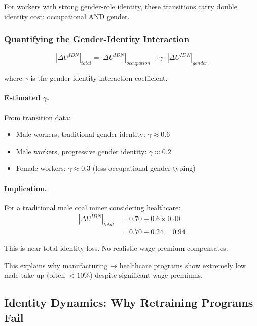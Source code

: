 For workers with strong gender-role identity, these transitions carry 
double identity cost: occupational AND gender.

\subsubsection{Quantifying the Gender-Identity Interaction}

\begin{equation}
|\Delta U^{IDN}|_{total} = |\Delta U^{IDN}|_{occupation} + \gamma \cdot |\Delta U^{IDN}|_{gender}
\label{eq:gender-identity}
\end{equation}

where $\gamma$ is the gender-identity interaction coefficient.

\paragraph{Estimated $\gamma$.}
From transition data:
\begin{itemize}
    \item Male workers, traditional gender identity: $\gamma \approx 0.6$
    \item Male workers, progressive gender identity: $\gamma \approx 0.2$
    \item Female workers: $\gamma \approx 0.3$ (less occupational gender-typing)
\end{itemize}

\paragraph{Implication.}
For a traditional male coal miner considering healthcare:
\begin{align}
|\Delta U^{IDN}|_{total} &= 0.70 + 0.6 \times 0.40 \nonumber \\
&= 0.70 + 0.24 = 0.94
\end{align}

This is near-total identity loss. No realistic wage premium compensates.

This explains why manufacturing → healthcare programs show extremely 
low male take-up (often $<10\%$) despite significant wage premiums.

\subsection{Identity Dynamics: Why Retraining Programs Fail}

